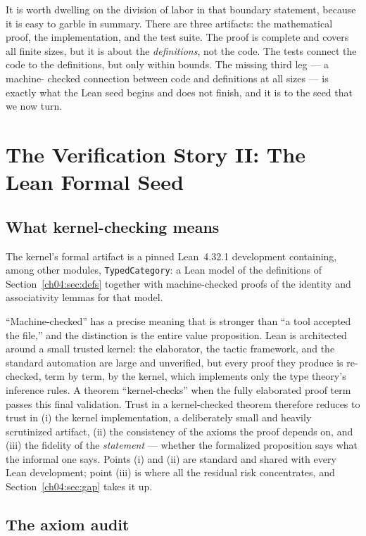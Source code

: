 It is worth dwelling on the division of labor in that boundary statement,
because it is easy to garble in summary. There are three artifacts: the
mathematical proof, the implementation, and the test suite. The proof is
complete and covers all finite sizes, but it is about the
\emph{definitions}, not the code. The tests connect the code to the
definitions, but only within bounds. The missing third leg --- a machine-
checked connection between code and definitions at all sizes --- is exactly
what the Lean seed begins and does not finish, and it is to the seed that we
now turn.

\section{The Verification Story II: The Lean Formal Seed}
\label{ch04:sec:lean}

\subsection{What kernel-checking means}

The kernel's formal artifact is a pinned Lean~4.32.1 development
\cite{lean4} containing, among other modules, \texttt{TypedCategory}: a Lean
model of the definitions of Section~\ref{ch04:sec:defs} together with
machine-checked proofs of the identity and associativity lemmas for that
model.

``Machine-checked'' has a precise meaning that is stronger than ``a tool
accepted the file,'' and the distinction is the entire value proposition.
Lean is architected around a small trusted kernel: the elaborator, the
tactic framework, and the standard automation are large and unverified, but
every proof they produce is re-checked, term by term, by the kernel, which
implements only the type theory's inference rules. A theorem ``kernel-checks''
when the fully elaborated proof term passes this final validation. Trust in
a kernel-checked theorem therefore reduces to trust in (i) the kernel
implementation, a deliberately small and heavily scrutinized artifact,
(ii) the consistency of the axioms the proof depends on, and (iii) the
fidelity of the \emph{statement} --- whether the formalized proposition says
what the informal one says. Points (i) and (ii) are standard and shared with
every Lean development; point (iii) is where all the residual risk
concentrates, and Section~\ref{ch04:sec:gap} takes it up.

\subsection{The axiom audit}

